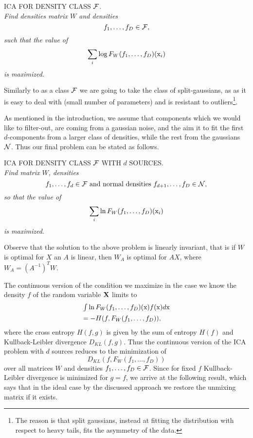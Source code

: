 \medskip

\noindent ICA FOR DENSITY CLASS $\mathcal{F}$.\\ {\em Find densities matrix $W$ and
densities
$$
f_1,\ldots,f_D \in \mathcal{F}, 
$$
such that the value of 
$$
\sum_i \log F_W(f_1,\ldots,f_D)(\mathrm{x}_i)
$$
is maximized.
}

\medskip

Similarly to \cite{ICA2017pattern} as a class $\mathcal{F}$ we are going to
take the class of split-gaussians, as 
as it is easy to deal with (small number of parameters) and is resistant to outliers\footnote{The reason is that split gaussians, instead at fitting the distribution with respect to heavy tails, fits the asymmetry of the data.}.

As mentioned in the introduction, we assume that components which we would like to filter-out, are coming from a gaussian noise, and the aim it to fit the first $d$-components from a larger class of densities, while the rest from the gaussians $\mathcal{N}$. Thus our final problem can be stated as follows.

\medskip

\noindent ICA FOR DENSITY CLASS $\mathcal{F}$ WITH $d$ SOURCES. \\{\em Find matrix $W$, densities 
$$
f_1,\ldots,f_d \in \mathcal{F} \text{ and normal densities } f_{d+1},\ldots,f_D \in \mathcal{N},
$$
so that the value of 
$$
\sum_i \ln F_W(f_1,\ldots,f_D)(\mathrm{x}_i)
$$
is maximized.
}

\medskip

Observe that the solution to the above problem is linearly invariant, that is if
$W$ is optimal for $X$ an $A$ is linear, then $W_A$ is optimal for $AX$,
where $W_A=(A^{-1})^TW$.

The continuous version of the condition we maximize in the case we know the density $f$
of the random variable $\mathbf{X}$ limits to
$$
\begin{array}{l}
\int \ln F_W(f_1,\ldots,f_D)(\mathrm{x})f(\mathrm{x}) d\mathrm{x}\\[1ex]
=-H(f,F_W(f_1,\ldots,f_D)),
\end{array}
$$
where the cross entropy $H(f,g)$ is given by the sum of entropy $H(f)$
and Kullback-Leibler divergence $D_{KL}(f,g)$. Thus the continuous version of the ICA problem
with $d$ sources reduces to the minimization of 
$$
D_{KL}(f,F_W(f_1,\ldots,f_D))
$$
over all matrices $W$ and densities $f_1,\ldots,f_D \in \mathcal{F}$. Since for fixed $f$ Kullback-Leibler divergence is minimized for $g=f$, we arrive at the following result, which says that in the ideal case 
by the discussed approach we restore the unmixing matrix if it exists.

